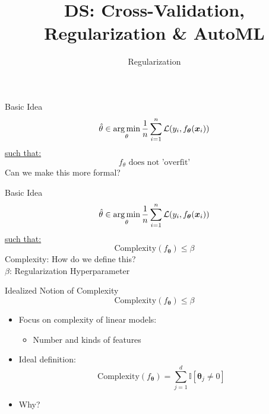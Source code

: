 \documentclass[aspectratio=169]{../latex_main/tntbeamer}  %
\title[CV, Reg \& AutoML]{DS: Cross-Validation, Regularization \& AutoML}
\subtitle{Regularization}
\begin{document}
	
	\maketitle
	\begin{frame}{Basic Idea}
	    \begin{equation*}
	        \hat{\theta} \in \operatorname*{arg\,min}_{\theta} \frac{1}{n}\sum\limits_{i=1}^n\mathcal{L}(y_i,f_{\bm{\theta}}(\bm{x}_i))
	    \end{equation*}
	    \underline{such that:}
	    \begin{equation*}
	        f_\theta \text{ does not 'overfit'}
	    \end{equation*}
	    Can we make this more formal?
	\end{frame}
	
	
	\begin{frame}[c]{Basic Idea}
	    \begin{equation*}
	        \hat{\theta} \in \operatorname*{arg\,min}_{\theta} \frac{1}{n}\sum\limits_{i=1}^n\mathcal{L}(y_i,f_{\bm{\theta}}(\bm{x}_i))
	    \end{equation*}
	    \underline{such that:}
	    \begin{equation*}
	         \text{Complexity}(f_{\bm{\theta}}) \leq \beta
	    \end{equation*}
	    Complexity: How do we define this?\\
	    $\beta$:  Regularization Hyperparameter

	\end{frame}
	
	
	\begin{frame}[c]{Idealized Notion of Complexity}
	   \begin{equation*}
	         \text{Complexity}(f_{\bm{\theta}}) \leq \beta
	    \end{equation*}
        \begin{itemize}
            \item Focus on complexity of linear models:
            \begin{itemize}
                \item Number and kinds of features
            \end{itemize}
            \item Ideal definition:
            \begin{equation*}
                \text{Complexity}(f_{\bm{\theta}}) = \sum\limits_{j=1}^d\mathbb{I}[\bm{\theta}_j \neq 0] 
            \end{equation*}
            \item Why?
        \end{itemize}
	\end{frame}
	
\end{document}
